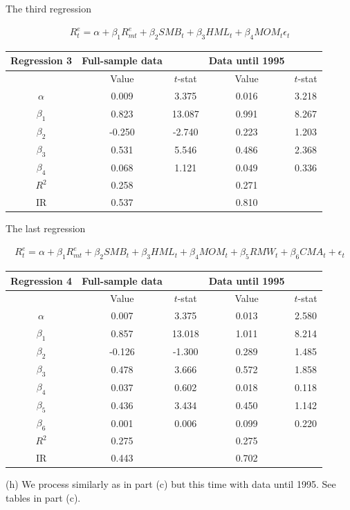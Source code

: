 \documentclass[10pt]{article}
\newenvironment{exercise}[2][Exercise]{\begin{trivlist}
  \item[\hskip \labelsep {\bfseries #1}\hskip \labelsep {\bfseries #2.}]}{\end{trivlist}}
\begin{document}
\begin{exercise}{3}
	The third regression
	
	\begin{align*}
		R_{t}^{e} = \alpha + \beta_{1}R^{e}_{mt} + \beta_{2}SMB_{t}+ \beta_{3}HML_{t} + \beta_{4}MOM_{t} \epsilon_{t} 
	\end{align*}

	\begin{table}[h!]
		\centering
 		\begin{tabular}{||c c c c c||} 
 			\hline
 			Regression 3 & Full-sample data & & Data until 1995 & \\ [0.5ex] 
 			\hline\hline
 		  	& Value & $t$-stat & Value & $t$-stat\\ [0.5ex] 
 			\hline\hline
 			$\alpha$ & 0.009 & 3.375 &  0.016 & 3.218\\ 
 			$\beta_{1}$ & 0.823 & 13.087 & 0.991 & 8.267\\
 			$\beta_{2}$ &  -0.250 & -2.740 & 0.223 & 1.203\\
 			$\beta_{3}$ &  0.531 & 5.546 & 0.486 & 2.368\\
 			$\beta_{4}$ & 0.068 & 1.121 & 0.049 & 0.336\\ [1ex]
 			\hline\hline
 			$R^{2}$ & 0.258 & & 0.271 &\\
 			IR & 0.537 & &  0.810 &\\ [1ex] 
 			\hline
		 \end{tabular}
	\end{table}
	
	The last regression
	
		\begin{align*}
		R_{t}^{e} = \alpha + \beta_{1}R^{e}_{mt} + \beta_{2}SMB_{t}+ \beta_{3}HML_{t} + \beta_{4}MOM_{t} + \beta_{5}RMW_{t} + \beta_{6}CMA_{t} + \epsilon_{t} 
	\end{align*}

	\begin{table}[h!]
		\centering
 		\begin{tabular}{||c c c c c||} 
 			\hline
 			Regression 4 & Full-sample data & & Data until 1995 & \\ [0.5ex] 
 			\hline\hline
 		  	& Value & $t$-stat & Value & $t$-stat\\ [0.5ex] 
 			\hline\hline
 			$\alpha$ & 0.007 & 3.375 & 0.013 &  2.580\\ 
 			$\beta_{1}$ & 0.857 & 13.018 & 1.011 & 8.214\\
 			$\beta_{2}$ &  -0.126 & -1.300 & 0.289 & 1.485\\
 			$\beta_{3}$ &  0.478 & 3.666 & 0.572 & 1.858\\
 			$\beta_{4}$ &  0.037 & 0.602 & 0.018 & 0.118\\
 			$\beta_{5}$ &  0.436 & 3.434 & 0.450 & 1.142\\
 			$\beta_{6}$ & 0.001 & 0.006 & 0.099 & 0.220\\ [1ex]
 			\hline\hline
 			$R^{2}$ & 0.275 & & 0.275 &\\
 			IR & 0.443 & & 0.702 &\\ [1ex] 
 			\hline
		 \end{tabular}
	\end{table}
	
	(h) We process similarly as in part (c) but this time with data until 1995. See tables in part (c).

\end{exercise}
  
\end{document}
